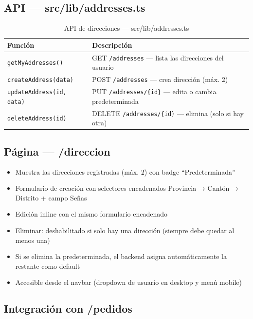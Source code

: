 \documentclass[12pt,a4paper]{article}
\begin{document}
\subsection{API --- src/lib/addresses.ts}

\begin{table}[H]
\centering
\begin{tabular}{@{}ll@{}}
\toprule
\textbf{Función} & \textbf{Descripción} \\
\midrule
\texttt{getMyAddresses()} & GET \texttt{/addresses} --- lista las direcciones del usuario \\
\texttt{createAddress(data)} & POST \texttt{/addresses} --- crea dirección (máx. 2) \\
\texttt{updateAddress(id, data)} & PUT \texttt{/addresses/\{id\}} --- edita o cambia predeterminada \\
\texttt{deleteAddress(id)} & DELETE \texttt{/addresses/\{id\}} --- elimina (solo si hay otra) \\
\bottomrule
\end{tabular}
\caption{API de direcciones --- src/lib/addresses.ts}
\end{table}

\subsection{Página --- /direccion}

\begin{itemize}
  \item Muestra las direcciones registradas (máx. 2) con badge ``Predeterminada''
  \item Formulario de creación con selectores encadenados Provincia → Cantón → Distrito + campo Señas
  \item Edición inline con el mismo formulario encadenado
  \item Eliminar: deshabilitado si solo hay una dirección (siempre debe quedar al menos una)
  \item Si se elimina la predeterminada, el backend asigna automáticamente la restante como default
  \item Accesible desde el navbar (dropdown de usuario en desktop y menú mobile)
\end{itemize}

\subsection{Integración con /pedidos}
\end{document}
